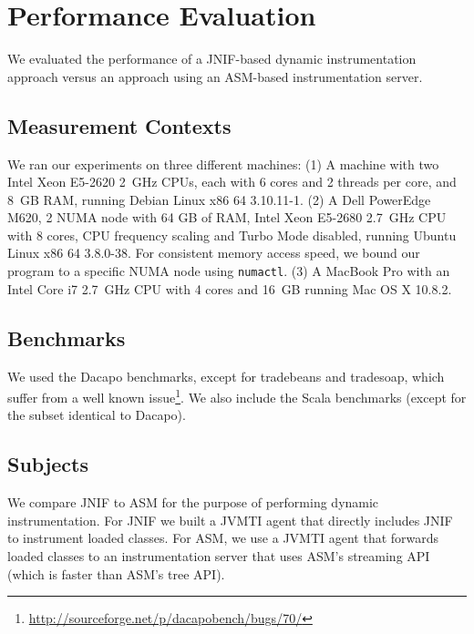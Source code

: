 \section{Performance Evaluation}
\label{sec:jnif-evaluation}

We evaluated the performance of a JNIF-based dynamic instrumentation approach 
versus an approach using an ASM-based instrumentation server.

\subsection{Measurement Contexts}

We ran our experiments on three different machines:
(1) A machine with two Intel Xeon E5-2620 2~GHz CPUs, 
each with 6 cores and 2 threads per core, 
and 8~GB RAM,
running Debian Linux x86 64 3.10.11-1.
(2) A Dell PowerEdge M620, 2 NUMA node with 64 GB of RAM, 
Intel Xeon E5-2680 2.7~GHz CPU
with 8 cores, 
CPU frequency scaling and Turbo Mode disabled,
running Ubuntu Linux x86 64 3.8.0-38.
For consistent memory access speed, 
we bound our program to a specific NUMA node using \texttt{numactl}.
(3) A MacBook Pro with an Intel Core i7 2.7~GHz CPU 
with 4 cores and 16~GB
running Mac OS X 10.8.2.

%




\subsection{Benchmarks}

We used the Dacapo benchmarks, 
except for tradebeans and tradesoap,
which suffer from a well known issue\footnote{\url{http://sourceforge.net/p/dacapobench/bugs/70/}}.
We also include the Scala benchmarks (except for the subset identical to Dacapo).





\subsection{Subjects}
We compare JNIF to ASM for the purpose of performing dynamic instrumentation.
For JNIF we built a JVMTI agent that directly includes JNIF to instrument loaded classes.
For ASM, we use a JVMTI agent that forwards loaded classes to an instrumentation server
that uses ASM's streaming API (which is faster than ASM's tree API).


